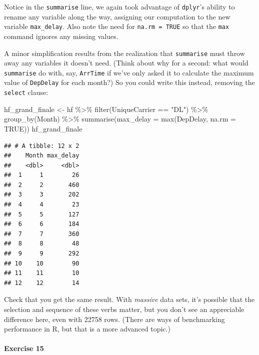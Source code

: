 \documentclass[
]{book}
\newenvironment{Shaded}{\begin{snugshade}}{\end{snugshade}}
\newcommand{\AttributeTok}[1]{\textcolor[rgb]{0.77,0.63,0.00}{#1}}
\newcommand{\ConstantTok}[1]{\textcolor[rgb]{0.00,0.00,0.00}{#1}}
\newcommand{\FunctionTok}[1]{\textcolor[rgb]{0.00,0.00,0.00}{#1}}
\newcommand{\NormalTok}[1]{#1}
\newcommand{\OtherTok}[1]{\textcolor[rgb]{0.56,0.35,0.01}{#1}}
\newcommand{\SpecialCharTok}[1]{\textcolor[rgb]{0.00,0.00,0.00}{#1}}
\newcommand{\StringTok}[1]{\textcolor[rgb]{0.31,0.60,0.02}{#1}}
\begin{document}
Notice in the \texttt{summarise} line, we again took advantage of \texttt{dplyr}'s ability to rename any variable along the way, assigning our computation to the new variable \texttt{max\_delay}. Also note the need for \texttt{na.rm\ =\ TRUE} so that the \texttt{max} command ignores any missing values.

A minor simplification results from the realization that \texttt{summarise} must throw away any variables it doesn't need. (Think about why for a second: what would \texttt{summarise} do with, say, \texttt{ArrTime} if we've only asked it to calculate the maximum value of \texttt{DepDelay} for each month?) So you could write this instead, removing the \texttt{select} clause:

\begin{Shaded}
\begin{Highlighting}[]
\NormalTok{hf\_grand\_finale }\OtherTok{\textless{}{-}}\NormalTok{ hf }\SpecialCharTok{\%\textgreater{}\%}
    \FunctionTok{filter}\NormalTok{(UniqueCarrier }\SpecialCharTok{==} \StringTok{"DL"}\NormalTok{) }\SpecialCharTok{\%\textgreater{}\%}
    \FunctionTok{group\_by}\NormalTok{(Month) }\SpecialCharTok{\%\textgreater{}\%}
    \FunctionTok{summarise}\NormalTok{(}\AttributeTok{max\_delay =} \FunctionTok{max}\NormalTok{(DepDelay, }\AttributeTok{na.rm =} \ConstantTok{TRUE}\NormalTok{))}
\NormalTok{hf\_grand\_finale}
\end{Highlighting}
\end{Shaded}

\begin{verbatim}
## # A tibble: 12 x 2
##    Month max_delay
##    <dbl>     <dbl>
##  1     1        26
##  2     2       460
##  3     3       202
##  4     4        23
##  5     5       127
##  6     6       184
##  7     7       360
##  8     8        48
##  9     9       292
## 10    10        90
## 11    11        10
## 12    12        14
\end{verbatim}

Check that you get the same result. With \emph{massive} data sets, it's possible that the selection and sequence of these verbs matter, but you don't see an appreciable difference here, even with 22758 rows. (There are ways of benchmarking performance in R, but that is a more advanced topic.)

\hypertarget{exercise-15}{%
\paragraph*{Exercise 15}\label{exercise-15}}
\end{document}
